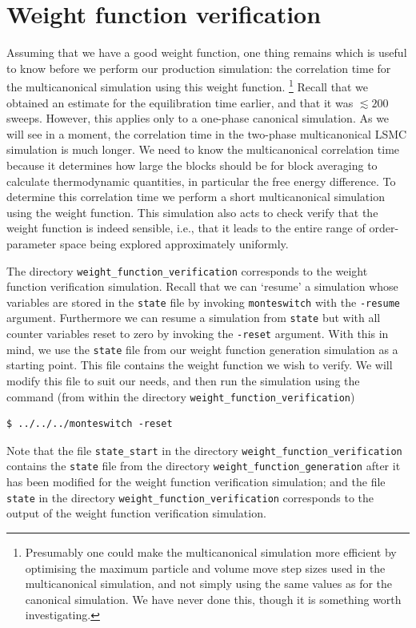 \documentclass{report}
\begin{document}
\section{Weight function verification}
Assuming that we have a good weight function, one thing remains which is useful to know before we perform our production simulation: the correlation time 
for the multicanonical simulation using this weight function.
\footnote{Presumably one could make the multicanonical simulation more efficient by optimising the maximum particle and volume move step sizes used in the 
multicanonical simulation, and not simply using the same values as for the canonical simulation. We have never done this, though it is something worth 
investigating.}
Recall that we obtained an estimate for the equilibration time earlier, and that it was $\lesssim 200$ sweeps. However, this applies only to 
a one-phase canonical simulation. As we will see in a moment, the correlation time in the two-phase multicanonical LSMC simulation is much longer. 
We need to know the multicanonical correlation time because it determines how large the blocks should be for block averaging to calculate thermodynamic quantities,
in particular the free energy difference. To determine this correlation time we perform a short multicanonical simulation using the weight function. This 
simulation also acts to check verify that the weight function is indeed sensible, i.e., that it leads to the entire range of order-parameter space being 
explored approximately uniformly.

The directory \texttt{weight\_function\_verification} corresponds to the weight function verification simulation.
Recall that we can `resume' a simulation whose variables are stored in the \texttt{state} file by invoking \texttt{monteswitch} with the 
\texttt{-resume} argument. Furthermore
we can resume a simulation from \texttt{state} but with all counter variables reset to zero by invoking the \texttt{-reset} argument. With this in mind, we
use the \texttt{state} file from our weight function generation simulation as a starting point. This file contains the weight function we wish to verify. 
We will modify this file to suit our needs, and then run the simulation using the command (from within the directory \texttt{weight\_function\_verification})
\begin{verbatim}
$ ../../../monteswitch -reset
\end{verbatim}
Note that the file \texttt{state\_start} in the directory \texttt{weight\_function\_verification} contains the \texttt{state} file from the directory 
\texttt{weight\_function\_generation} after it has been modified for the weight function verification simulation; and the file \texttt{state} in the 
directory \texttt{weight\_function\_verification} corresponds to the output of the weight function verification simulation.
\end{document}
